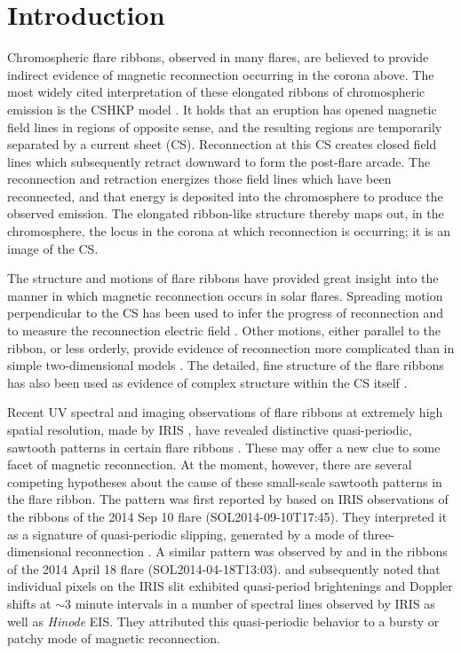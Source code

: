 
\section{Introduction}

Chromospheric flare ribbons, observed in many flares, are believed to provide indirect evidence of magnetic reconnection occurring in the corona above.
The most widely cited interpretation of these elongated ribbons of chromospheric emission is the CSHKP model
\citep{Carmichael1964,Sturrock1968,Hirayama1974,Kopp1976}.  It holds that an eruption has opened magnetic field lines in regions of opposite sense, and the resulting regions are temporarily separated by a current sheet (CS).  Reconnection at this CS creates closed field lines which subsequently retract downward to form the post-flare arcade.  The reconnection and retraction energizes those field lines which have been reconnected, and that energy is deposited into the chromosphere to produce the observed emission.  The elongated ribbon-like structure thereby maps out, in the chromosphere, the locus in the corona at which reconnection is occurring; it is an image of the CS.

The structure and motions of flare ribbons have provided great insight into the manner in which magnetic reconnection occurs in solar flares.  Spreading motion perpendicular to the CS has been used to infer the progress of reconnection and to measure the reconnection electric field \citep{Forbes1984,Poletto1986,Qiu2002,Qiu2004,Isobe2005}.  Other motions, either parallel to the ribbon, or less orderly, provide evidence of reconnection more complicated than in simple two-dimensional models \citep{Warren2001,Fletcher2004,Qiu2009,Li2015}.  The detailed, fine structure of the flare ribbons has also been used as evidence of complex structure within the CS itself \citep{Nishizuka2009}.

Recent UV spectral and imaging observations of flare ribbons at extremely high spatial resolution, made by IRIS \citep{dePontieu2014}, have revealed distinctive quasi-periodic, sawtooth patterns in certain flare ribbons \citep{Li2015,Brannon2015,Brosius2015,Brosius2016}.  These may offer a new clue to some facet of magnetic reconnection.  At the moment, however, there are several competing hypotheses about the cause of these small-scale
sawtooth patterns in the flare ribbon.  The pattern was first reported by \citet{Li2015} based on IRIS observations of the ribbons of the 2014 Sep 10 flare (SOL2014-09-10T17:45).  They interpreted it as a signature of quasi-periodic slipping, generated by a mode of three-dimensional reconnection \citep{Aulanier2006}.  A similar pattern was observed by \citet{Brannon2015} and \citet{Brosius2015} in the ribbons of the 2014 April 18 flare (SOL2014-04-18T13:03).  \citet{Brosius2015} and subsequently \citet{Brosius2016} noted that individual pixels on the IRIS slit exhibited quasi-period brightenings and Doppler shifts at $\sim 3$ minute intervals in a number of spectral lines observed by IRIS as well as {\em Hinode} EIS.  They attributed this quasi-periodic behavior to a bursty or patchy mode of magnetic reconnection.

